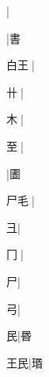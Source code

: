 \begin{multicols}{2}
{{}\mktsJzrVerticalBar{}{\cjk{}{\cnsym{}　}{\cnsym{}　}{\cnsym{}　}}|{}\par
{}\mktsJzrVerticalBar{}{\cjk{}{\cnsym{}　}{\cnsym{}　}{\cnsym{}　}}|{\cjk{}書}\par
{\cjk{}白王{\cnjzr{}}}\mktsJzrVerticalBar{}{\cjk{}{\cnsym{}　}{\cnsym{}　}{\cnsym{}　}}|{}\par
{\cjk{}{\cnsym{}　}卄{\cnjzr{}}}\mktsJzrVerticalBar{}{\cjk{}{\cnsym{}　}{\cnsym{}　}{\cnsym{}　}}|{}\par
{\cjk{}{\cnsym{}　}木{\cnjzr{}}}\mktsJzrVerticalBar{}{\cjk{}{\cnsym{}　}{\cnsym{}　}{\cnsym{}　}}|{}\par
{\cjk{}{\cnsym{}　}至{\cnjzr{}}}\mktsJzrVerticalBar{}{\cjk{}{\cnsym{}　}{\cnsym{}　}{\cnsym{}　}}|{}\par
{}\mktsJzrVerticalBar{}{\cjk{}{\cnsym{}　}{\cnsym{}　}{\cnsym{}　}}|{\cjk{}圕}\par
{\cjk{}尸毛{\cnjzr{}}}\mktsJzrVerticalBar{}{\cjk{}{\cnsym{}　}{\cnsym{}　}{\cnsym{}　}}|{}\par
{彐}\mktsJzrVerticalBar{}{\cjk{}{\cnsym{}　}{\cnsym{}　}{\cnsym{}　}}|{}\par
{冂{\cnjzr{}}}\mktsJzrVerticalBar{}{\cjk{}{\cnsym{}　}{\cnsym{}　}{\cnsym{}　}}|{}\par
{\cjk{}{\cnsym{}　}{\cnsym{}　}尸}\mktsJzrVerticalBar{}{\cjk{}{\cnsym{}　}{\cnsym{}　}{\cnsym{}　}}|{}\par
{弓}\mktsJzrVerticalBar{}{\cjk{}{\cnsym{}　}{\cnsym{}　}{\cnsym{}　}}|{}\par
{\cjk{}{\cnsym{}　}{\cnsym{}　}民}\mktsJzrVerticalBar{}{\cjk{}{\cnsym{}　}{\cnsym{}　}{\cnsym{}　}}|{\cjk{}昬}\par
{\cjk{}{\cnsym{}　}王民}\mktsJzrVerticalBar{}{\cjk{}{\cnsym{}　}{\cnsym{}　}{\cnsym{}　}}|{\cjk{}瑉}\par
}
\end{multicols}
